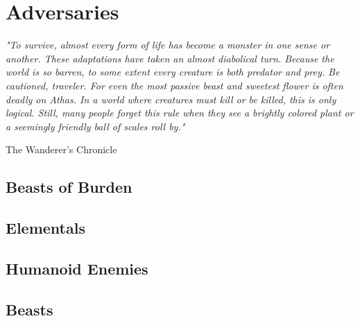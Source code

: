 \chapter{Adversaries}\label{chap:adversaries}

\epigraph{\textit{
    "To survive, almost every form of life has become a monster in one sense or another. These adaptations have taken an
    almost diabolical turn. Because the world is so barren, to some extent every creature is both predator and prey.
    Be cautioned, traveler. For even the most passive beast and sweetest flower is often deadly on Athas. In a world where
    creatures must kill or be killed, this is only logical. Still, many people forget this rule when they see a brightly
    colored plant or a seemingly friendly ball of scales roll by." } } {The Wanderer’s Chronicle}

\begin{multicols*}{2}

\section {Beasts of Burden}






\section {Elementals}


\section {Humanoid Enemies}





\section {Beasts}





\end{multicols*}

